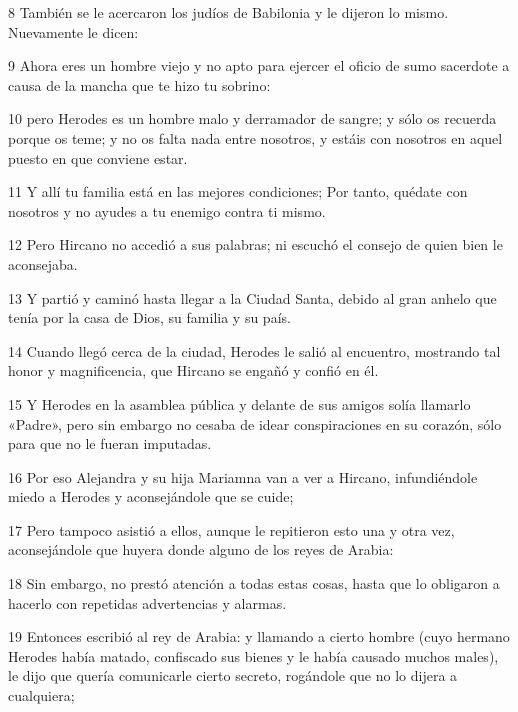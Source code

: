 \par 8 También se le acercaron los judíos de Babilonia y le dijeron lo mismo. Nuevamente le dicen:

\par 9 Ahora eres un hombre viejo y no apto para ejercer el oficio de sumo sacerdote a causa de la mancha que te hizo tu sobrino:

\par 10 pero Herodes es un hombre malo y derramador de sangre; y sólo os recuerda porque os teme; y no os falta nada entre nosotros, y estáis con nosotros en aquel puesto en que conviene estar.

\par 11 Y allí tu familia está en las mejores condiciones; Por tanto, quédate con nosotros y no ayudes a tu enemigo contra ti mismo.

\par 12 Pero Hircano no accedió a sus palabras; ni escuchó el consejo de quien bien le aconsejaba.

\par 13 Y partió y caminó hasta llegar a la Ciudad Santa, debido al gran anhelo que tenía por la casa de Dios, su familia y su país.

\par 14 Cuando llegó cerca de la ciudad, Herodes le salió al encuentro, mostrando tal honor y magnificencia, que Hircano se engañó y confió en él.

\par 15 Y Herodes en la asamblea pública y delante de sus amigos solía llamarlo «Padre», pero sin embargo no cesaba de idear conspiraciones en su corazón, sólo para que no le fueran imputadas.

\par 16 Por eso Alejandra y su hija Mariamna van a ver a Hircano, infundiéndole miedo a Herodes y aconsejándole que se cuide;

\par 17 Pero tampoco asistió a ellos, aunque le repitieron esto una y otra vez, aconsejándole que huyera donde alguno de los reyes de Arabia:

\par 18 Sin embargo, no prestó atención a todas estas cosas, hasta que lo obligaron a hacerlo con repetidas advertencias y alarmas.

\par 19 Entonces escribió al rey de Arabia: y llamando a cierto hombre (cuyo hermano Herodes había matado, confiscado sus bienes y le había causado muchos males), le dijo que quería comunicarle cierto secreto, rogándole que no lo dijera a cualquiera;

